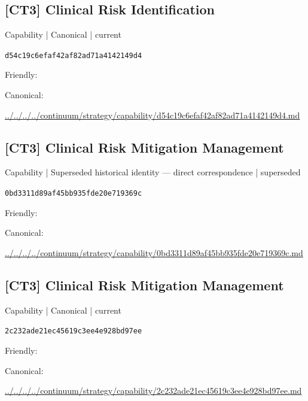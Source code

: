 \documentclass[10pt,a4paper]{article}
\begin{document}
\subsection*{[CT3] Clinical Risk Identification}
{\small Capability | Canonical | current}\par
\texttt{d54c19c6efaf42af82ad71a4142149d4}\par
Friendly: \par
Canonical: \par
{\footnotesize\url{../../../../continuum/strategy/capability/d54c19c6efaf42af82ad71a4142149d4.md}}\par
\subsection*{[CT3] Clinical Risk Mitigation Management}
{\small Capability | Superseded historical identity — direct correspondence | superseded}\par
\texttt{0bd3311d89af45bb935fde20e719369c}\par
Friendly: \par
Canonical: \par
{\footnotesize\url{../../../../continuum/strategy/capability/0bd3311d89af45bb935fde20e719369c.md}}\par
\subsection*{[CT3] Clinical Risk Mitigation Management}
{\small Capability | Canonical | current}\par
\texttt{2c232ade21ec45619c3ee4e928bd97ee}\par
Friendly: \par
Canonical: \par
{\footnotesize\url{../../../../continuum/strategy/capability/2c232ade21ec45619c3ee4e928bd97ee.md}}\par
\end{document}
